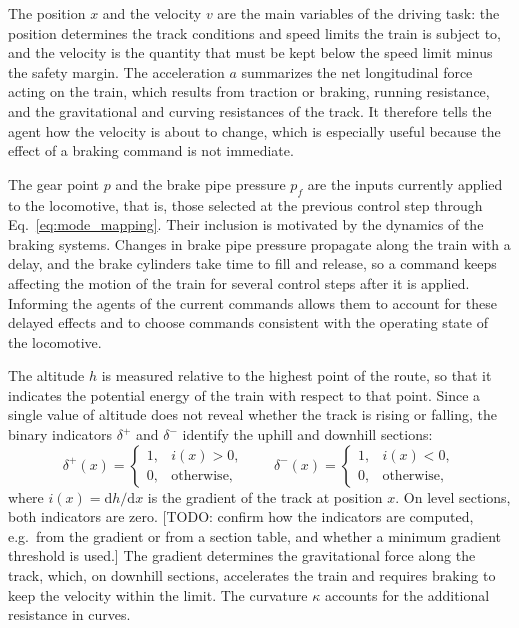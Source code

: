 \documentclass[preprint,10pt]{elsarticle}
\begin{document}
The position $x$ and the velocity $v$ are the main variables of the driving task: the position determines the track conditions and speed limits the train is subject to, and the velocity is the quantity that must be kept below the speed limit minus the safety margin. The acceleration $a$ summarizes the net longitudinal force acting on the train, which results from traction or braking, running resistance, and the gravitational and curving resistances of the track. It therefore tells the agent how the velocity is about to change, which is especially useful because the effect of a braking command is not immediate.

The gear point $p$ and the brake pipe pressure $p_f$ are the inputs currently applied to the locomotive, that is, those selected at the previous control step through Eq.~\eqref{eq:mode_mapping}. Their inclusion is motivated by the dynamics of the braking systems. Changes in brake pipe pressure propagate along the train with a delay, and the brake cylinders take time to fill and release, so a command keeps affecting the motion of the train for several control steps after it is applied. Informing the agents of the current commands allows them to account for these delayed effects and to choose commands consistent with the operating state of the locomotive.

The altitude $h$ is measured relative to the highest point of the route, so that it indicates the potential energy of the train with respect to that point. Since a single value of altitude does not reveal whether the track is rising or falling, the binary indicators $\delta^{+}$ and $\delta^{-}$ identify the uphill and downhill sections:
\begin{equation}
    \delta^{+}(x) =
    \begin{cases}
        1, & i(x) > 0, \\
        0, & \text{otherwise},
    \end{cases}
    \qquad
    \delta^{-}(x) =
    \begin{cases}
        1, & i(x) < 0, \\
        0, & \text{otherwise},
    \end{cases}
    \label{eq:slope_indicators}
\end{equation}
where $i(x) = \mathrm{d}h/\mathrm{d}x$ is the gradient of the track at position $x$. On level sections, both indicators are zero. [TODO: confirm how the indicators are computed, e.g.\ from the gradient or from a section table, and whether a minimum gradient threshold is used.] The gradient determines the gravitational force along the track, which, on downhill sections, accelerates the train and requires braking to keep the velocity within the limit. The curvature $\kappa$ accounts for the additional resistance in curves.
\end{document}
